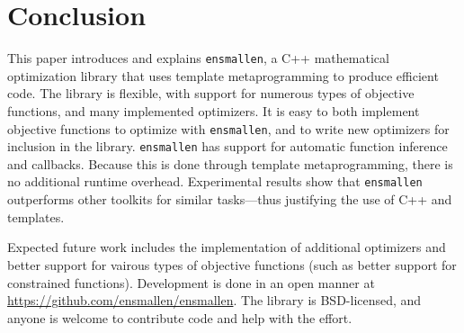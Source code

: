 \section{Conclusion}
\label{sec:conclusion}

This paper introduces and explains {\tt ensmallen}, a C++ mathematical
optimization library that uses template metaprogramming to produce efficient
code.  The library is flexible, with support for numerous types of objective
functions, and many implemented optimizers.  It is easy to both implement
objective functions to optimize with {\tt ensmallen}, and to write new
optimizers for inclusion in the library.  {\tt ensmallen} has support for
automatic function inference and callbacks.  Because this is done through
template metaprogramming, there is no additional runtime overhead.  Experimental
results show that {\tt ensmallen} outperforms other toolkits for similar
tasks---thus justifying the use of C++ and templates.

Expected future work includes the implementation of additional optimizers
and better support for vairous types of objective functions
(such as better support for constrained functions).
Development is done in an open manner at \mbox{\url{https://github.com/ensmallen/ensmallen}}.
The library is BSD-licensed, and anyone is welcome to contribute code
and help with the effort.
